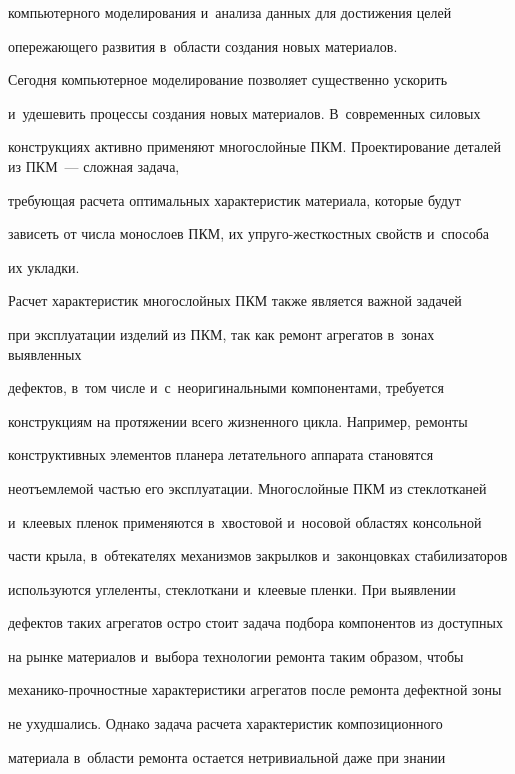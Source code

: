 компьютерного моделирования и~анализа данных для достижения целей 


опережающего развития в~области создания новых материалов.


     


     Сегодня компьютерное моделирование позволяет существенно ускорить 


и~удешевить процессы создания новых материалов. В~современных силовых 


конструкциях активно применяют многослойные ПКМ. Проектирование деталей из ПКМ~--- сложная задача, 


требующая расчета оптимальных характеристик материала, которые будут 


зависеть от числа монослоев ПКМ, их упру\-го-жест\-кост\-ных свойств и~способа 


их укладки. 


     


     Расчет характеристик многослойных ПКМ также является важной задачей 


при эксплуатации изделий из ПКМ, так как ремонт агрегатов в~зонах выявленных 


дефектов, в~том числе и~с~неоригинальными компонентами, требуется 


конструкциям на протяжении всего жизненного цикла. Например, ремонты 


конструктивных элементов планера летательного аппарата становятся 


неотъемлемой частью его эксплуатации. Многослойные ПКМ из стеклотканей 


и~клеевых пленок применяются в~хвостовой и~носовой областях консольной 


части крыла, в~обтекателях механизмов закрылков и~законцовках стабилизаторов 


используются углеленты, стеклоткани и~клеевые пленки. При выявлении 


дефектов таких агрегатов остро стоит задача подбора компонентов из доступных 


на рынке материалов и~выбора технологии ремонта таким образом, чтобы 


механико-прочностные характеристики агрегатов после ремонта дефектной зоны 


не ухудшались. Однако задача расчета характеристик композиционного 


материала в~области ремонта остается нетривиальной даже при знании 


